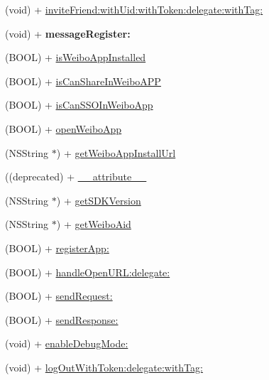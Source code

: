 \begin{DoxyCompactItemize}
\item 
(void) + \mbox{\hyperlink{interface_weibo_s_d_k_a12e37cf863202654e615232885fa596f}{invite\+Friend\+:with\+Uid\+:with\+Token\+:delegate\+:with\+Tag\+:}}
\item 
\mbox{\label{interface_weibo_s_d_k_afd33ff21d39c13140c2c2d3f69d368ce}} 
(void) + {\bfseries message\+Register\+:}
\item 
(B\+O\+OL) + \mbox{\hyperlink{interface_weibo_s_d_k_af88507558450c5e2f390ecf8fb157071}{is\+Weibo\+App\+Installed}}
\item 
(B\+O\+OL) + \mbox{\hyperlink{interface_weibo_s_d_k_aa32c8c6bf4847f6cdc134cec9955f3d2}{is\+Can\+Share\+In\+Weibo\+A\+PP}}
\item 
(B\+O\+OL) + \mbox{\hyperlink{interface_weibo_s_d_k_adc233f097b5c5e0d99ebc326ffd2548a}{is\+Can\+S\+S\+O\+In\+Weibo\+App}}
\item 
(B\+O\+OL) + \mbox{\hyperlink{interface_weibo_s_d_k_aab11f361fa5ac787f89fdf8621d160bc}{open\+Weibo\+App}}
\item 
(N\+S\+String $\ast$) + \mbox{\hyperlink{interface_weibo_s_d_k_a49504103f9378dcde673b4c6b52b71e3}{get\+Weibo\+App\+Install\+Url}}
\item 
((deprecated) + \mbox{\hyperlink{interface_weibo_s_d_k_a40d5808e5f4f3957ef8255baeaa3c484}{\+\_\+\+\_\+attribute\+\_\+\+\_\+}}
\item 
(N\+S\+String $\ast$) + \mbox{\hyperlink{interface_weibo_s_d_k_a691f8c3d5605163a7873eb0dbc754f79}{get\+S\+D\+K\+Version}}
\item 
(N\+S\+String $\ast$) + \mbox{\hyperlink{interface_weibo_s_d_k_aec605d5ae27958199c450a8eda005298}{get\+Weibo\+Aid}}
\item 
(B\+O\+OL) + \mbox{\hyperlink{interface_weibo_s_d_k_ae11cd35ddd3b8ab9f0dea249e830aa72}{register\+App\+:}}
\item 
(B\+O\+OL) + \mbox{\hyperlink{interface_weibo_s_d_k_a4a0d371f214612aa4c31ff1096796203}{handle\+Open\+U\+R\+L\+:delegate\+:}}
\item 
(B\+O\+OL) + \mbox{\hyperlink{interface_weibo_s_d_k_a765c7577fb1d6bf1e4ebf0ecdd4f6268}{send\+Request\+:}}
\item 
(B\+O\+OL) + \mbox{\hyperlink{interface_weibo_s_d_k_af0a51ae27b64cf65bba05a1ea9c5d6e5}{send\+Response\+:}}
\item 
(void) + \mbox{\hyperlink{interface_weibo_s_d_k_a34fc58188a69b4585b4f49cda4f3cc17}{enable\+Debug\+Mode\+:}}
\item 
(void) + \mbox{\hyperlink{interface_weibo_s_d_k_aaa71820983aaf80d9893dd313ba0ceb9}{log\+Out\+With\+Token\+:delegate\+:with\+Tag\+:}}

\end{DoxyCompactItemize}
